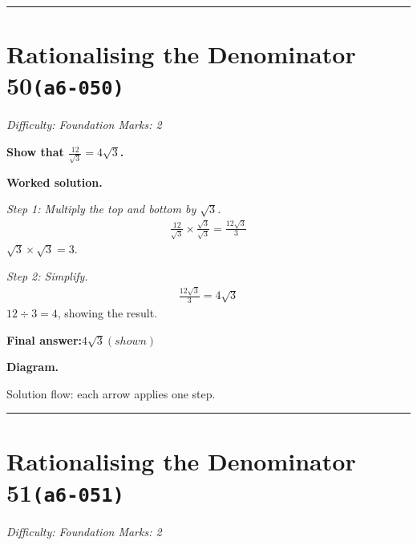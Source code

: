 \documentclass[11pt]{article}
\newcommand{\question}[1]{\par\medskip\noindent\textbf{#1}\par}
\begin{document}
\medskip\hrule

\section*{Rationalising the Denominator 50\quad\small\texttt{(a6-050)}}
\textit{Difficulty: Foundation \quad\textbar\quad Marks: 2}

\question{Show that \( \frac{12}{\sqrt{3}} = 4\sqrt{3} \).}

\textbf{Worked solution.}

\textit{Step 1: Multiply the top and bottom by \( \sqrt{3} \).}
\[\begin{gathered}
\frac{12}{\sqrt{3}} \times \frac{\sqrt{3}}{\sqrt{3}} = \frac{12\sqrt{3}}{3}
\end{gathered}\]
\( \sqrt{3} \times \sqrt{3} = 3 \).

\textit{Step 2: Simplify.}
\[\begin{gathered}
\frac{12\sqrt{3}}{3} = 4\sqrt{3}
\end{gathered}\]
\( 12 \div 3 = 4 \), showing the result.

\begin{answerbox}
\textbf{Final answer:}\quad \(\displaystyle 4\sqrt{3} ( shown )\)
\end{answerbox}
\textbf{Diagram.}

\begin{center}
\end{center}
\small Solution flow: each arrow applies one step.\normalsize

\medskip\hrule

\section*{Rationalising the Denominator 51\quad\small\texttt{(a6-051)}}
\textit{Difficulty: Foundation \quad\textbar\quad Marks: 2}
\end{document}
